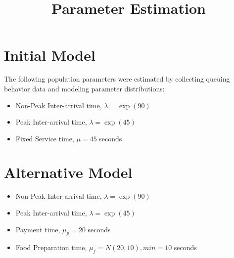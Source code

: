 \documentclass{article}
\begin{document}
\pagecolor{ultramarine}
\title{Parameter Estimation}
\author{}
\date{}
\maketitle
\section{Initial Model}
The following population parameters were estimated by collecting queuing
behavior data and modeling parameter distributions:
\begin{itemize}
    \item Non-Peak Inter-arrival time, $\lambda = \exp(90)$
    \item Peak Inter-arrival time, $\lambda = \exp(45)$
    \item Fixed Service time, $\mu = 45$ seconds
\end{itemize}
\section{Alternative Model}
\begin{itemize}
    \item Non-Peak Inter-arrival time, $\lambda = \exp(90)$
    \item Peak Inter-arrival time, $\lambda = \exp(45)$
    \item Payment time, $\mu_p = 20$ seconds
    \item Food Preparation time, $\mu_f = N(20,10), min=10$ seconds
\end{itemize}
\end{document}
